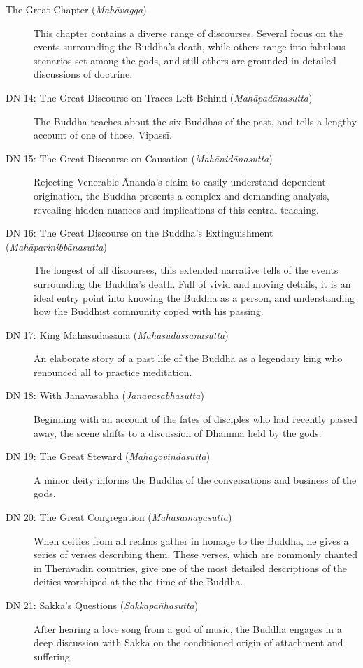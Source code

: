 \documentclass[12pt,openany]{book}%
\begin{document}
\begin{description}%
\item[The Great Chapter (\textit{\textsanskrit{Mahāvagga}})] This chapter contains a diverse range of discourses. Several focus on the events surrounding the Buddha’s death, while others range into fabulous scenarios set among the gods, and still others are grounded in detailed discussions of doctrine.%
\item[DN 14: The Great Discourse on Traces Left Behind (\textit{\textsanskrit{Mahāpadānasutta}})] The Buddha teaches about the six Buddhas of the past, and tells a lengthy account of one of those, \textsanskrit{Vipassī}.%
\item[DN 15: The Great Discourse on Causation (\textit{\textsanskrit{Mahānidānasutta}})] Rejecting Venerable Ānanda’s claim to easily understand dependent origination, the Buddha presents a complex and demanding analysis, revealing hidden nuances and implications of this central teaching.%
\item[DN 16: The Great Discourse on the Buddha’s Extinguishment (\textit{\textsanskrit{Mahāparinibbānasutta}})] The longest of all discourses, this extended narrative tells of the events surrounding the Buddha’s death. Full of vivid and moving details, it is an ideal entry point into knowing the Buddha as a person, and understanding how the Buddhist community coped with his passing.%
\item[DN 17: King \textsanskrit{Mahāsudassana} (\textit{\textsanskrit{Mahāsudassanasutta}})] An elaborate story of a past life of the Buddha as a legendary king who renounced all to practice meditation.%
\item[DN 18: With Janavasabha (\textit{\textsanskrit{Janavasabhasutta}})] Beginning with an account of the fates of disciples who had recently passed away, the scene shifts to a discussion of Dhamma held by the gods.%
\item[DN 19: The Great Steward (\textit{\textsanskrit{Mahāgovindasutta}})] A minor deity informs the Buddha of the conversations and business of the gods.%
\item[DN 20: The Great Congregation (\textit{\textsanskrit{Mahāsamayasutta}})] When deities from all realms gather in homage to the Buddha, he gives a series of verses describing them. These verses, which are commonly chanted in Theravadin countries, give one of the most detailed descriptions of the deities worshiped at the the time of the Buddha.%
\item[DN 21: Sakka’s Questions (\textit{\textsanskrit{Sakkapañhasutta}})] After hearing a love song from a god of music, the Buddha engages in a deep discussion with Sakka on the conditioned origin of attachment and suffering.%

\end{description}
\end{document}

